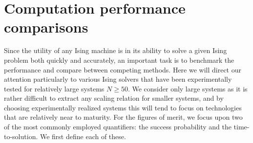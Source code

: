 \documentclass[fleqn,10pt]{wlscirep}
\begin{document}
\section*{Computation performance comparisons \label{Performance}}


Since the utility of any Ising machine is in its ability to solve a given Ising problem both quickly and accurately, an important task is to benchmark the performance and compare between competing methods. 
Here we will direct our attention particularly to various Ising solvers that have been experimentally tested for relatively large systems $ N \ge 50 $.   We consider only large systems as it is rather difficult to extract any scaling relation for smaller systems, and 
by choosing experimentally realized systems this will tend to focus on technologies that are relatively near to maturity.  For the figures of merit,  we focus upon two of the most commonly employed quantifiers: the success probability and the time-to-solution.  We first define each of these.
\end{document}

